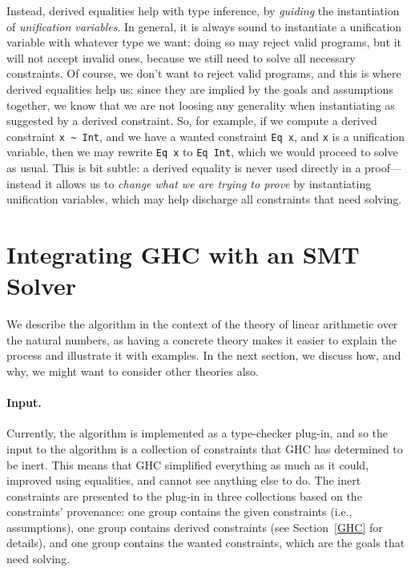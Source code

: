 \documentclass{sigplanconf}
\begin{document}
Instead, derived equalities help with type inference, by {\em guiding} the
instantiation of {\em unification variables}. In general,
it is always sound to instantiate a unification variable with whatever
type we want: doing so may reject valid programs, but it will not accept
invalid ones, because we still need to solve all necessary constraints.
Of course, we don't want to reject valid programs, and this is where derived
equalities help us: since they are implied by the goals and assumptions
together, we know that we are not loosing any generality when instantiating
as suggested by a derived constraint.  So, for example, if we compute a
derived constraint \Verb"x ~ Int", and we have a wanted constraint
\Verb"Eq x", and \Verb"x" is a unification variable, then we may
rewrite \Verb"Eq x" to \Verb"Eq Int", which we would proceed to solve
as usual.  This is bit subtle:  a derived equality is never used directly
in a proof---instead it allows us to {\em change what we are trying to prove}
by instantiating unification variables, which may help discharge all
constraints that need solving.

\section{Integrating GHC with an SMT Solver}
\label{algorithm}

We describe the algorithm in the context of the theory of linear arithmetic
over the natural numbers, as having a concrete theory makes it easier to explain
the process and illustrate it with examples.  In the next section,
we discuss how, and why, we might want to consider other theories also.

\paragraph{Input.} Currently, the algorithm is implemented as a type-checker
plug-in, and so the input to the algorithm is a collection of constraints
that GHC has determined to be inert. This means that GHC simplified everything
as much as it could, improved using equalities, and cannot see
anything else to do.  The inert constraints are presented to the plug-in
in three collections based on the constraints' provenance: one group contains
the given constraints (i.e., assumptions), one group contains derived
constraints (see Section~\ref{GHC} for details), and one group contains
the wanted constraints, which are the goals that need solving.
\end{document}
